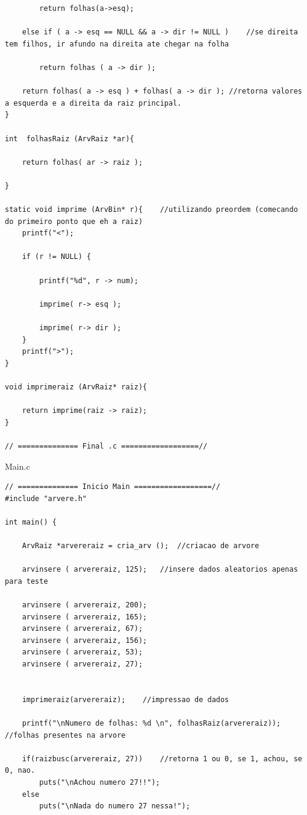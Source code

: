 \documentclass[11pt]{article} %
\begin{document}
\begin{enumerate}[a)]
\begin{lstlisting}
		return folhas(a->esq);
	
	else if ( a -> esq == NULL && a -> dir != NULL ) 	//se direita tem filhos, ir afundo na direita ate chegar na folha
	
		return folhas ( a -> dir );
	
	return folhas( a -> esq ) + folhas( a -> dir );	//retorna valores a esquerda e a direita da raiz principal.
} 

int  folhasRaiz (ArvRaiz *ar){
	
	return folhas( ar -> raiz );
	
}

static void imprime (ArvBin* r){ 	//utilizando preordem (comecando do primeiro ponto que eh a raiz)
	printf("<");
	
	if (r != NULL) {

		printf("%d", r -> num);
		
		imprime( r-> esq );
				
		imprime( r-> dir );
	}
	printf(">");
}

void imprimeraiz (ArvRaiz* raiz){

	return imprime(raiz -> raiz);
}

// ============== Final .c ==================//
	\end{lstlisting}

\newpage

\begin{center}
Main.c
\end{center}
\begin{lstlisting}
// ============== Inicio Main ==================//
#include "arvere.h"

int main() {
	
	ArvRaiz *arvereraiz = cria_arv (); 	//criacao de arvore
	
	arvinsere ( arvereraiz, 125); 	//insere dados aleatorios apenas para teste
	
	arvinsere ( arvereraiz, 200); 
	arvinsere ( arvereraiz, 165); 
	arvinsere ( arvereraiz, 67);  
	arvinsere ( arvereraiz, 156); 
	arvinsere ( arvereraiz, 53);  
	arvinsere ( arvereraiz, 27);  
	
	
	imprimeraiz(arvereraiz);	//impressao de dados
	
	printf("\nNumero de folhas: %d \n", folhasRaiz(arvereraiz));	//folhas presentes na arvore
	
	if(raizbusc(arvereraiz, 27))	//retorna 1 ou 0, se 1, achou, se 0, nao.
		puts("\nAchou numero 27!!");
	else
		puts("\nNada do numero 27 nessa!");
	

\end{lstlisting}
\end{enumerate}
\end{document}
